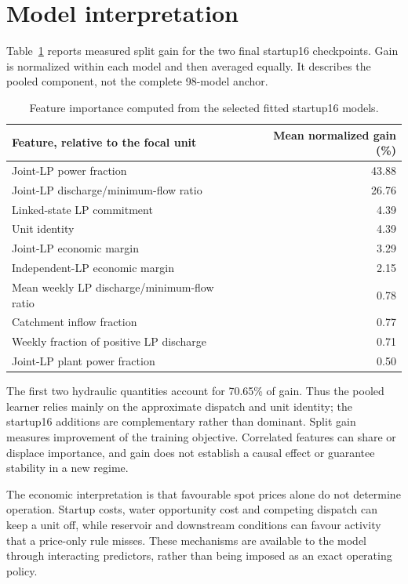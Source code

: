 \documentclass[a4paper,11pt]{article}
\begin{document}
\section{Model interpretation}
Table~\ref{importance} reports measured split gain for the two final startup16 checkpoints. Gain is normalized within each model and then averaged equally. It describes the pooled component, not the complete 98-model anchor.

\begin{table}[ht]
\centering\small
\begin{tabular}{lr}
\hline
Feature, relative to the focal unit & Mean normalized gain (\%)\\\hline
Joint-LP power fraction & 43.88\\
Joint-LP discharge/minimum-flow ratio & 26.76\\
Linked-state LP commitment & 4.39\\
Unit identity & 4.39\\
Joint-LP economic margin & 3.29\\
Independent-LP economic margin & 2.15\\
Mean weekly LP discharge/minimum-flow ratio & 0.78\\
Catchment inflow fraction & 0.77\\
Weekly fraction of positive LP discharge & 0.71\\
Joint-LP plant power fraction & 0.50\\\hline
\end{tabular}
\caption{Feature importance computed from the selected fitted startup16 models.}\label{importance}
\end{table}

The first two hydraulic quantities account for 70.65\% of gain. Thus the pooled learner relies mainly on the approximate dispatch and unit identity; the startup16 additions are complementary rather than dominant. Split gain measures improvement of the training objective. Correlated features can share or displace importance, and gain does not establish a causal effect or guarantee stability in a new regime.

The economic interpretation is that favourable spot prices alone do not determine operation. Startup costs, water opportunity cost and competing dispatch can keep a unit off, while reservoir and downstream conditions can favour activity that a price-only rule misses. These mechanisms are available to the model through interacting predictors, rather than being imposed as an exact operating policy.
\end{document}
